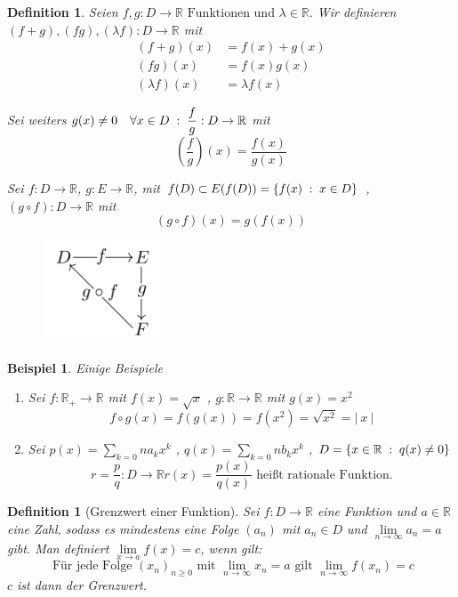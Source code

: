 \documentclass[a4paper,titlepage,oneside]{article}
\def\R{\ensuremath{\mathbb{R}} }
\def\sp{\hspace{0,1cm}}
\def\spcolon{\sp:\sp}
\renewcommand{\liminf}[2][n]{\ensuremath{\lim\limits_{#1 \rightarrow \infty}{#2}}}
\newcommand{\abs}[1]{\ensuremath{\left|\:#1\:\right|}}
\newcommand{\menge}[2]{\ensuremath{\left\{#1\sp : \sp #2\right\}}}
\theoremstyle{thmstyle}
\newtheorem{defi}[satz]{Definition}
\newtheorem{bsp}[satz]{Beispiel}
\theoremstyle{subthmstyle}
\begin{document}
\begin{defi}
Seien \(f,g : D \to \R \text{ Funktionen und } \lambda \in \R.\) Wir definieren \((f+g), (fg), (\lambda f) : D \to \R \) mit
\begin{align*}
(f+g)(x) &= f(x) + g(x) \\
(fg)(x) &= f(x) g(x) \\
(\lambda f)(x) &= \lambda f(x)
\end{align*}

Sei weiters $\displaystyle g(x) \ne 0 \quad \forall x \in D \spcolon \frac{f}{g} : D \to \R $ mit
\[\left(\frac{f}{g}\right)(x) = \frac{f(x)}{g(x)}\]

Sei \( f: D \to \R\), \(g: E \to \R\), mit \(f(D) \subset E (f(D)) = \menge{f(x)}{x \in D}\) , \((g  \circ  f)  :  D \to \R\) mit
\[(g \circ f)(x) = g(f(x))\]
\begin{figure}[ht]\centering
 \includegraphics[width=0.33\textwidth]{images/DEF.png}
\end{figure}
\end{defi}

\begin{bsp}
Einige Beispiele
\begin{enumerate}
\item Sei \(f: \R_+ \to \R\) mit \(f(x) = \sqrt{x}\) , \(g: \R \to \R\) mit \(g(x) = x^2\)
\[f \circ g(x) = f(g(x)) = f(x^2) = \sqrt{x^2} = \abs{x}\]

\item Sei \(p(x) = \sum_{k=0}{n}{a_kx^k}\) , \(q(x) = \sum_{k=0}{n}{b_kx^k}\) , \(D = \menge{x\in \R}{q(x) \ne 0}\)
 \[r = \frac{p}{q} : D \to \R r(x) = \frac{p(x)}{q(x)} \text{ heißt rationale Funktion.}\]
\end{enumerate}
\end{bsp}

\begin{defi}[Grenzwert einer Funktion]
Sei $f : D \to \R$ eine Funktion und $a \in \R$ eine Zahl, sodass es mindestens eine Folge $(a_n)$ mit $a_n \in D$ und $\liminf{a_n} = a $ gibt.
Man definiert \(\lim\limits_{x \to a}{ f(x)} = c\), wenn gilt:
\[\text{ Für jede Folge } (x_n)_{n\ge0} \text{ mit } \liminf{x_n} = a \text{ gilt } \liminf{f(x_n)} = c\]
$c$ ist dann der Grenzwert.
\end{defi}
\end{document}
